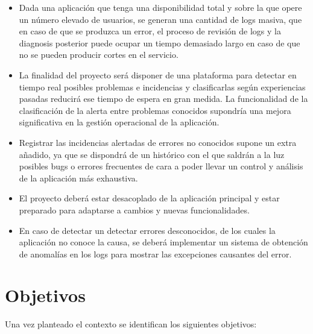 \begin{itemize}
\item Dada una aplicación que tenga una disponibilidad total y sobre la que opere un número elevado
de usuarios, se generan una cantidad de logs masiva, que en caso de que se produzca un error, el proceso de revisión de logs y la diagnosis posterior puede ocupar un tiempo
demasiado largo en caso de que no se pueden producir cortes en el servicio.

\item La finalidad del proyecto será disponer de una plataforma para detectar en tiempo real posibles problemas e incidencias y
clasificarlas según experiencias pasadas reducirá ese tiempo de espera en gran medida. La funcionalidad de la clasificación de la alerta entre problemas conocidos supondría una mejora significativa en la gestión operacional de la aplicación.

\item Registrar las incidencias alertadas de errores no conocidos supone un extra añadido, ya que se dispondrá de un histórico
con el que saldrán a la luz posibles bugs o errores frecuentes de cara a poder llevar un control
y análisis de la aplicación más exhaustiva.  

\item El proyecto deberá estar desacoplado de la aplicación principal y estar preparado para adaptarse a cambios y nuevas funcionalidades.

\item En caso de detectar un detectar errores desconocidos, de los cuales la aplicación no conoce la causa, se deberá implementar un sistema de obtención de anomalías en los logs para mostrar las excepciones causantes del error.

\end{itemize}



\section{Objetivos}

Una vez planteado el contexto se identifican los siguientes objetivos:


